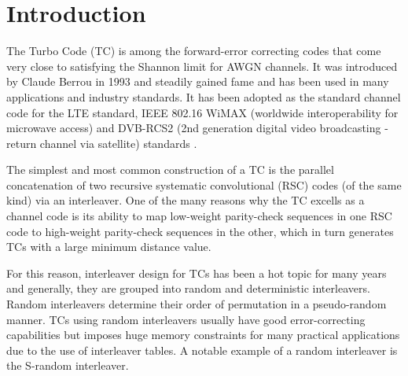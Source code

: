 \section{Introduction}

The Turbo Code (TC) \cite{ref1} is among the forward-error correcting codes that come very close to satisfying the Shannon limit for AWGN channels. It was introduced by Claude Berrou in 1993 and steadily gained fame and has been used in many applications and industry standards. It has been adopted as the standard channel code for the LTE standard, IEEE 802.16 WiMAX (worldwide interoperability for microwave access) and DVB-RCS2 (2nd generation digital video broadcasting - return channel via satellite) standards \cite{ref7}.

 The simplest and most common construction of a TC is the parallel concatenation of two recursive systematic convolutional (RSC) codes (of the same kind) via an interleaver. One of the many reasons why the TC excells as a channel code is its ability to map low-weight parity-check sequences in one RSC code to high-weight parity-check sequences in the other, which in turn generates TCs with a large minimum distance value.

 For this reason, interleaver design for TCs has been a hot topic for many years and generally, they are grouped into random and deterministic interleavers. Random interleavers determine their order of permutation in a pseudo-random manner. TCs using random interleavers usually have good error-correcting capabilities but imposes huge memory constraints for many practical applications due to the use of interleaver tables. A notable example of a random interleaver is the S-random interleaver.

